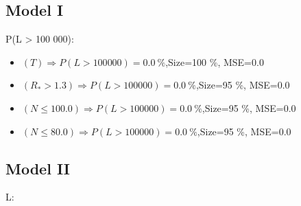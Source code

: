 \documentclass[numbered]{CSL}
\begin{document}
\subsection{Model I}
P(L > 100 000):
\begin{itemize}
\item $(T) \Rightarrow P(L > 100 000) = 0.0~\%$,\hfill Size=100 \%, MSE=0.0
\item $(R_* > 1.3) \Rightarrow P(L > 100 000) = 0.0~\%$,\hfill Size=95 \%, MSE=0.0
\item $(N \leq 100.0) \Rightarrow P(L > 100 000) = 0.0~\%$,\hfill Size=95 \%, MSE=0.0
\item $(N \leq 80.0) \Rightarrow P(L > 100 000) = 0.0~\%$,\hfill Size=95 \%, MSE=0.0
\end{itemize}

\subsection{Model II}
L:
\end{document}
